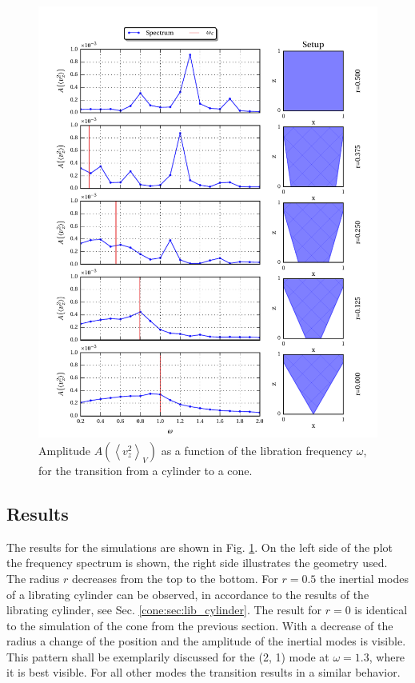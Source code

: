 \begin{figure}[!pt]
  \centering
  \includegraphics{gfx/cone/transition/transition.pdf}
  \caption{\label{fig:cone:transition}
      Amplitude $A\left(\left<v^2_z\right>_V\right)$ as a function of the libration frequency $\omega$,
      for the transition from a cylinder to a cone.
  }
\end{figure}

\subsection{Results}%

The results for the simulations are shown in Fig. \ref{fig:cone:transition}.
On the left side of the plot  the frequency spectrum is shown, the right side illustrates the geometry used.
The radius $r$ decreases from the top to the bottom.
For $r=0.5$  the inertial modes of a librating cylinder can be observed, in accordance
to the results of the librating  cylinder, see Sec. \ref{cone:sec:lib_cylinder}.
The result for $r=0$ is identical to the simulation of the cone from the previous section.
With a decrease of the radius a change of the position and the amplitude of the
inertial modes is visible.
This pattern shall be exemplarily discussed  for the (2, 1) mode at $\omega=1.3$, where it is best visible.
For all other modes the transition results in a similar behavior.

